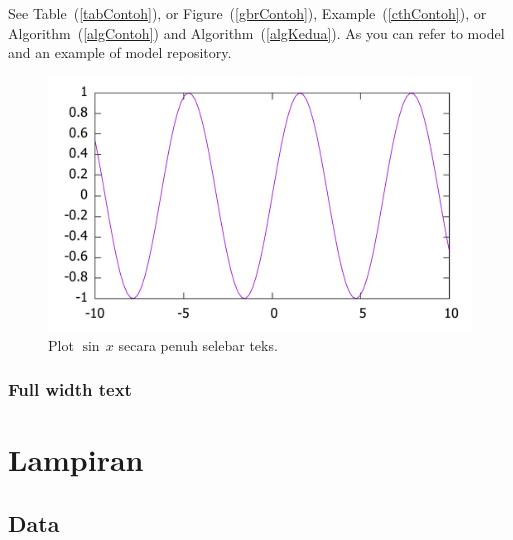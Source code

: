 \documentclass[12pt,justified,a4paper,twoside,symmetric,titlepage]{tufte-book}
\begin{document}
\lipsum[2]

See Table~(\ref{tabContoh}), or Figure~(\ref{gbrContoh}), Example~(\ref{cthContoh}), or Algorithm~(\ref{algContoh}) and  Algorithm~(\ref{algKedua}). As you can refer to model\cite{stepien2002} and an example of model repository\cite{siess2000}.

\begin{figure}
\label{gbrPenuh}
\begin{center}
\includegraphics[width=\textwidth]{plotsinus.pdf}
\end{center}
\caption{Plot $\sin\,x$ secara penuh selebar teks.}
\end{figure}

\lipsum[1-6]

\section{Full width text}

\begin{fullwidth}
\lipsum[1-3]
\end{fullwidth}

\lipsum[3]

\appendix

\part{Lampiran}

\chapter{Data}
\lipsum



\end{document}
